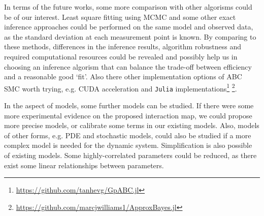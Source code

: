 In terms of the future works, some more comparison with other algorisms could be of our interest. Least square fitting using MCMC \cite{ref:MCMC} and some other exact inference approaches could be performed on the same model and observed data, as the standard deviation at each measurement point is known. By comparing to these methods, differences in the inference results, algorithm robustness and required computational resources could be revealed and possibly help us in choosing an inference algorism that can balance the trade-off between efficiency and a reasonable good `fit'. Also there other implementation options of ABC SMC worth trying, e.g. CUDA acceleration and \verb|Julia| implementations\footnote[1]{\url{https://github.com/tanhevg/GpABC.jl}} \footnote[2]{\url{https://github.com/marcjwilliams1/ApproxBayes.jl}}.

In the aspect of models, some further models can be studied. If there were some more experimental evidence on the proposed interaction map, we could propose more precise models, or calibrate some terms in our existing models. Also, models of other forms, e.g. PDE and stochastic models, could also be studied if a more complex model is needed for the dynamic system. Simplification is also possible of existing models. Some highly-correlated parameters could be reduced, as there exist some linear relationships between parameters.  

